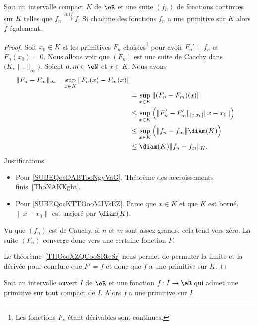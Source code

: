 \begin{proposition}    \label{PropQACVooBnHtRJ}
	Soit un intervalle compact \( K\) de \( \eR\) et une suite \( (f_n)\) de fonctions continues sur \( K\) telles que \( f_n\stackrel{unif}{\longrightarrow}f\). Si chacune des fonctions \( f_n\) a une primitive sur \( K\) alors \( f\) également.
\end{proposition}

\begin{proof}
	Soit \( x_0\in K\) et les primitives \( F_n\) choisies\footnote{Les fonctions \( F_n\) étant dérivables sont continues.} pour avoir \( F_n'=f_n\) et \( F_n(x_0)=0\). Nous allons voir que \( (F_n)\) est une suite de Cauchy dans \( \big( K,\| . \|_{\infty} \big)\). Soient \( n,m\in \eN\) et \( x\in K\). Nous avons
	\begin{subequations}
		\begin{align}
            \| F_n-F_m \|_{\infty}=\sup_{x\in K}\| F_n(x)-F_m(x) \|\\
            &=\sup_{x\in K}\| (F_n-F_m)(x) \|\\
            &\leq\sup_{x\in K}\Big( \| F_n'-F_m' \|_{\mathopen[ x , x_0 \mathclose]}\| x-x_0 \| \Big)   \label{SUBEQooDABTooNgyVaG}\\
            &\leq\sup_{x\in K}\Big( \| f_n-f_m \|\diam(K) \Big) \label{SUBEQooKTTOooMJVsEZ}\\
            &\leq \diam(K)\| f_n-f_m \|_K.
		\end{align}
	\end{subequations}
    Justifications.
    \begin{itemize}
        \item Pour \eqref{SUBEQooDABTooNgyVaG}. Théorème des accroissements finis~\ref{ThoNAKKght}. 
        \item Pour \eqref{SUBEQooKTTOooMJVsEZ}. Parce que \( x\in K\) et que \( K\) est borné, \( \| x-x_0 \|\) est majoré par \( \diam(K)\).
    \end{itemize}
	Vu que \( (f_n) \) est de Cauchy, si \( n\) et \( m\) sont assez grands, cela tend vers zéro. La suite \( (F_n)\) converge donc vers une certaine fonction \( F\).

	Le théorème~\ref{THOooXZQCooSRteSr} nous permet de permuter la limite et la dérivée pour conclure que \( F'=f\) et donc que \( f\) a une primitive sur \( K\).
\end{proof}

\begin{proposition}        \label{PropKKGAooDQYGKg}
	Soit un intervalle ouvert \( I\) de \( \eR\) et une fonction \( f\colon I\to \eR\) qui admet une primitive sur tout compact de \( I\). Alors \( f\) a une primitive sur \( I\).
\end{proposition}

